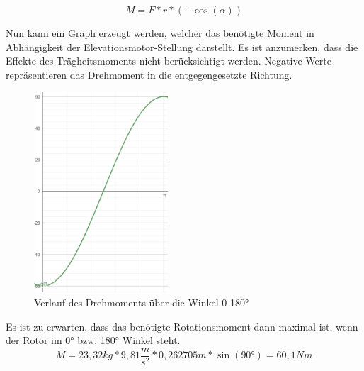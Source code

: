\begin{equation}
	M=F*r*(-\cos(\alpha))
\end{equation}

Nun kann ein Graph erzeugt werden, welcher das benötigte Moment in Abhängigkeit der Elevationsmotor-Stellung darstellt. Es ist anzumerken, dass die Effekte des Trägheitsmoments nicht berücksichtigt werden. Negative Werte repräsentieren das Drehmoment in die entgegengesetzte Richtung.

\begin{figure}[h!]
	\centering
	\includegraphics[width=5cm]{../ref/Rotationsmoment Elevation.png}
	\caption{Verlauf des Drehmoments über die Winkel 0-180°}
	\label{fig:verlauf-drehmoment}
\end{figure}

Es ist zu erwarten, dass das benötigte Rotationsmoment dann maximal ist, wenn der Rotor im 0° bzw. 180° Winkel steht. 
\begin{equation}
	M=23,32kg*9,81\frac{m}{s^2}*0,262705m*\sin(90°)=60,1Nm
\end{equation}

